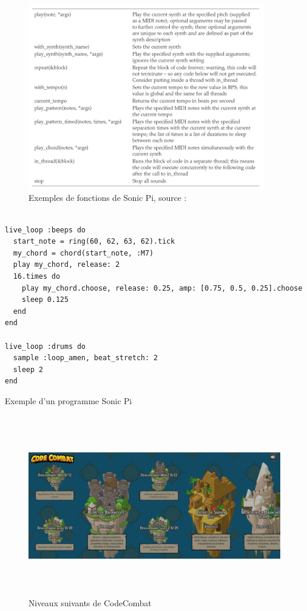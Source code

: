 \begin{figure}[!htb]
  \centering
  \includegraphics[width=105mm,scale=0.5]{images/sonic_pi_primitives.PNG}
  \caption{Exemples de fonctions de Sonic Pi, source : \cite{19}}
  \label{fig:boat1}
\end{figure}

\begin{lstlisting}[frame=single]

live_loop :beeps do
  start_note = ring(60, 62, 63, 62).tick
  my_chord = chord(start_note, :M7)
  play my_chord, release: 2
  16.times do
    play my_chord.choose, release: 0.25, amp: [0.75, 0.5, 0.25].choose
    sleep 0.125
  end
end

live_loop :drums do
  sample :loop_amen, beat_stretch: 2
  sleep 2
end

\end{lstlisting}

Exemple d'un programme Sonic Pi


\begin{figure}[!htb]
  \centering
  \includegraphics[height=80mm, width=150mm,scale=0.5]{images/codecombat3.PNG}
  \caption{Niveaux suivants de CodeCombat}
  \label{fig:boat1}
\end{figure}

